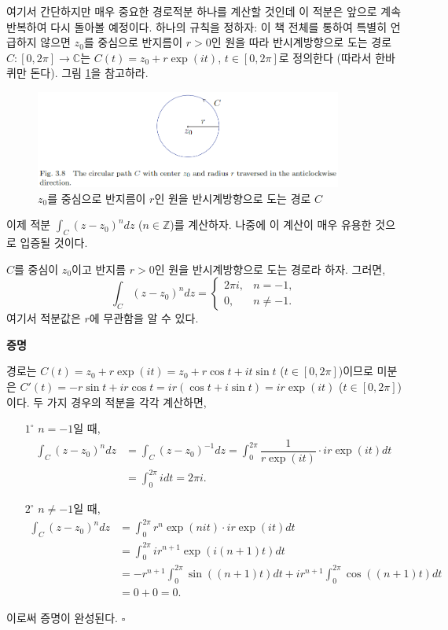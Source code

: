 여기서 간단하지만 매우 중요한 경로적분 하나를 계산할 것인데
이 적분은 앞으로 계속 반복하여 다시 돌아볼 예정이다.
하나의 규칙을 정하자: 이 책 전체를 통하여 특별히 언급하지 않으면
$z_0$를 중심으로 반지름이 $r>0$인 원을 따라 반시계방향으로 도는 경로
$C: [0, 2\pi] \to \mathbb C$는 $C(t) = z_0 + r\exp(it)$, $t\in[0,2\pi]$로 정의한다
(따라서 한바퀴만 돈다). 그림 \ref{fig-3-8}을 참고하라.
\begin{figure}[!h]
\begin{center}
\includegraphics[width=0.9\textwidth]{./SaltChapter/fig-3-8}
\end{center}
\caption{$z_0$를 중심으로 반지름이 $r$인 원을 반시계방향으로 도는 경로 $C$}
\label{fig-3-8}
\end{figure}

이제 적분 $\int_C (z-z_0)^n dz$ ($n\in\mathbb Z$)를 계산하자.
나중에 이 계산이 매우 유용한 것으로 입증될 것이다.

\begin{salttheorem}{}{} \label{thm-3-1}
$C$를 중심이 $z_0$이고 반지름 $r>0$인 원을 반시계방향으로 도는 경로라 하자.
그러면,
\[
\int_C (z-z_0)^n dz = \begin{cases}
2\pi i, & n=-1,\\
0, & n\ne -1.
\end{cases}
\]
여기서 적분값은 $r$에 무관함을 알 수 있다.
\end{salttheorem}

{\bf 증명}

경로는 $C(t) = z_0 + r\exp(it) = z_0 + r\cos t + it\sin t$ ($t\in[0,2\pi]$)이므로
미분은 $C'(t) = -r\sin t + ir\cos t = ir(\cos t + i\sin t) = ir\exp(it)$ ($t\in[0,2\pi]$)이다.
두 가지 경우의 적분을 각각 계산하면,

\begin{itemize}
\item[$1^\circ$] $n=-1$일 때,
\begin{align*}
\int_C (z-z_0)^n dz
&= \int_C (z-z_0)^{-1} dz = \int_0^{2\pi} \dfrac1{r\exp(it)}\cdot ir \exp(it)dt \\
&= \int_0^{2\pi} i dt  = 2\pi i.
\end{align*}
\item[$2^\circ$] $n\ne -1$일 때,
\begin{align*}
\int_C (z-z_0)^n dz
&= \int_0^{2\pi} r^n \exp(nit) \cdot ir \exp(it)dt \\
&= \int_0^{2\pi} ir^{n+1} \exp(i(n+1)t)dt \\
&= -r^{n+1} \int_0^{2\pi} \sin((n+1)t)dt + 
ir^{n+1} \int_0^{2\pi} \cos((n+1)t)dt \\
&= 0+0 = 0.
\end{align*}
\end{itemize}
이로써 증명이 완성된다.
\hfill $\square$

